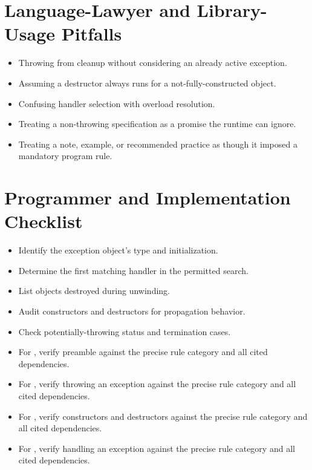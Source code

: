 \documentclass[11pt,letterpaper]{article}
\begin{document}
\section{Language-Lawyer and Library-Usage Pitfalls}
\begin{CornellReferencePitfallBox}\begin{itemize}[label=\textcolor{CornellReferenceAmber}{$\blacktriangleright$}]
\item Throwing from cleanup without considering an already active exception.
\item Assuming a destructor always runs for a not-fully-constructed object.
\item Confusing handler selection with overload resolution.
\item Treating a non-throwing specification as a promise the runtime can ignore.
\item Treating a note, example, or recommended practice as though it imposed a mandatory program rule.
\end{itemize}\end{CornellReferencePitfallBox}
\section{Programmer and Implementation Checklist}
\begin{CornellReferenceChecklistBox}\begin{itemize}[label=$\square$]
\item Identify the exception object's type and initialization.
\item Determine the first matching handler in the permitted search.
\item List objects destroyed during unwinding.
\item Audit constructors and destructors for propagation behavior.
\item Check potentially-throwing status and termination cases.
\item For , verify preamble against the precise rule category and all cited dependencies.
\item For , verify throwing an exception against the precise rule category and all cited dependencies.
\item For , verify constructors and destructors against the precise rule category and all cited dependencies.
\item For , verify handling an exception against the precise rule category and all cited dependencies.
\end{itemize}\end{CornellReferenceChecklistBox}
\end{document}
